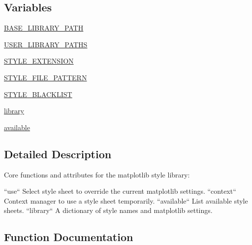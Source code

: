 \subsection*{Variables}
\begin{DoxyCompactItemize}
\item 
\hyperlink{namespacematplotlib_1_1style_1_1core_a117c22eb75611021d43b69d1d971d26a}{B\+A\+S\+E\+\_\+\+L\+I\+B\+R\+A\+R\+Y\+\_\+\+P\+A\+TH}
\item 
\hyperlink{namespacematplotlib_1_1style_1_1core_a0a5ad3fae449d1efaf13a8fe3133528c}{U\+S\+E\+R\+\_\+\+L\+I\+B\+R\+A\+R\+Y\+\_\+\+P\+A\+T\+HS}
\item 
\hyperlink{namespacematplotlib_1_1style_1_1core_a52737a05b96304a26693e4e4c1abf4d2}{S\+T\+Y\+L\+E\+\_\+\+E\+X\+T\+E\+N\+S\+I\+ON}
\item 
\hyperlink{namespacematplotlib_1_1style_1_1core_aad34d19e4db6919ddea275595dec7416}{S\+T\+Y\+L\+E\+\_\+\+F\+I\+L\+E\+\_\+\+P\+A\+T\+T\+E\+RN}
\item 
\hyperlink{namespacematplotlib_1_1style_1_1core_a5fe219acd4005f94072737ddcd90a495}{S\+T\+Y\+L\+E\+\_\+\+B\+L\+A\+C\+K\+L\+I\+ST}
\item 
\hyperlink{namespacematplotlib_1_1style_1_1core_a9a119f100ad7d6dd795ba9f2e3f58c14}{library}
\item 
\hyperlink{namespacematplotlib_1_1style_1_1core_a9b41d9049d8c37c31f8007711fa863a0}{available}
\end{DoxyCompactItemize}


\subsection{Detailed Description}
\begin{DoxyVerb}Core functions and attributes for the matplotlib style library:

``use``
Select style sheet to override the current matplotlib settings.
``context``
Context manager to use a style sheet temporarily.
``available``
List available style sheets.
``library``
A dictionary of style names and matplotlib settings.
\end{DoxyVerb}
 

\subsection{Function Documentation}
\mbox{\label{namespacematplotlib_1_1style_1_1core_a4b6573cbad37ba7c73edd44c7b64e387}} 
